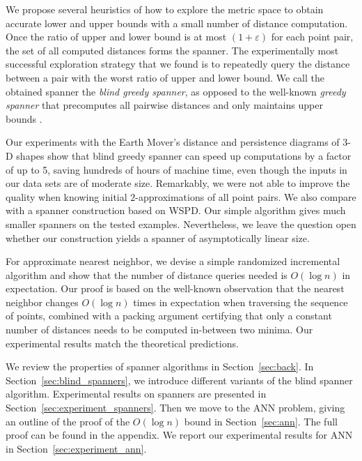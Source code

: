 \documentclass{ws-ijcga}
\newcommand{\eps}{\varepsilon}
\begin{document}
We propose several heuristics of how to explore the metric space to obtain accurate lower and upper bounds
with a small number of distance computation. Once the ratio of upper and lower bound is at most $(1+\eps)$
for each point pair, the set of all computed distances forms the spanner.
The experimentally most successful exploration strategy that we found is to
repeatedly query the distance between a pair with the worst ratio of upper and lower bound.
We call the obtained spanner the \emph{blind greedy spanner}, as opposed to the well-known
\emph{greedy spanner} that precomputes all pairwise distances and only maintains upper bounds \cite{althofer1993sparse}.


Our experiments with the Earth Mover's distance and persistence
diagrams of 3-D shapes show that blind greedy spanner can speed up computations
by a factor of up to 5, saving hundreds of hours of machine time,
even though the inputs in our data sets are of moderate size.
Remarkably, we were not able to improve the quality when knowing initial $2$-approximations of all point pairs.
We also compare with a spanner construction based on WSPD. Our simple algorithm gives much smaller
spanners on the tested examples. 
Nevertheless, we leave the question open whether our construction
yields a spanner of asymptotically linear size. 

For approximate nearest neighbor, we devise a simple randomized incremental algorithm and show that
the number of distance queries needed is $O(\log n)$ in expectation.
Our proof is based on the well-known observation that the nearest neighbor changes $O(\log n)$ times
in expectation when traversing the sequence of points, combined with a packing argument certifying that
only a constant number of distances needs to be computed in-between two minima.
Our experimental results match the theoretical predictions.

We review the properties of spanner algorithms in Section~\ref{sec:back}.
In Section~\ref{sec:blind_spanners}, we introduce different
variants of the blind spanner algorithm. Experimental
results on spanners are presented in Section~\ref{sec:experiment_spanners}.
Then we move to the ANN problem, giving
an outline of the proof of the $O(\log n)$ bound in Section~\ref{sec:ann}.
The full proof can be found in the appendix.
We report our experimental results for ANN in Section~\ref{sec:experiment_ann}.
\end{document}
